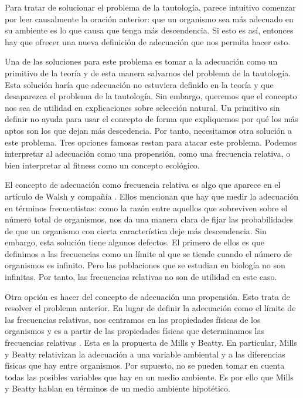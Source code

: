 Para tratar de solucionar el problema de la tautología, parece intuitivo comenzar por leer causalmente la oración anterior: que un organismo sea más adecuado en su ambiente es lo que causa que tenga más descendencia. Si esto es así, entonces hay que ofrecer una nueva definición de adecuación que nos permita hacer esto.

Una de las soluciones para este problema es tomar a la adecuación como un primitivo de la teoría y de esta manera salvarnos del problema de la tautología. Esta solución haría que adecuación no estuviera definido en la teoría y que desaparezca el problema de la tautología. Sin embargo, queremos que el concepto nos sea de utilidad en explicaciones sobre selección natural. Un primitivo sin definir no ayuda para usar el concepto de forma que expliquemos por qué los más aptos son los que dejan más descedencia. Por tanto, necesitamos otra solución a este problema. Tres opciones famosas restan para atacar este problema. Podemos interpretar al adecuación como una propensión, como una frecuencia relativa, o bien interpretar al fitness como un concepto ecológico.

El concepto de adecuación como frecuencia relativa es algo que aparece en el artículo de Walsh y compañía \citeyear{Walsh2002}. Ellos mencionan que hay que medir la adecuación en términos frecuentistas: como la razón entre aquellos que sobreviven sobre el número total de organismos, nos da una manera clara de fijar las probabilidades de que un organismo con cierta característica deje más descendencia. Sin embargo, esta solución tiene algunos defectos. El primero de ellos es que definimos a las frecuencias como un límite al que se tiende cuando el número de organismos es infinito. Pero las poblaciones que se estudian en biología no son infinitas. Por tanto, las frecuencias relativas no son de utilidad en este caso.

Otra opción es hacer del concepto de adecuación una propensión. Esto trata de resolver el problema anterior. En lugar de definir la adecuación como el límite de las frecuencias relativas, nos centramos en las propiedades físicas de los organismos y es a partir de las propiedades físicas que determinamos las frecuencias relativas \cite{Mills1979}. Esta es la propuesta de Mills y Beatty. En particular, Mills y Beatty relativizan la adecuación a una variable ambiental y a las diferencias físicas que hay entre organismos. Por supuesto, no se pueden tomar en cuenta todas las posibles variables que hay en un medio ambiente. Es por ello que Mills y Beatty hablan en términos de un medio ambiente hipotético.

